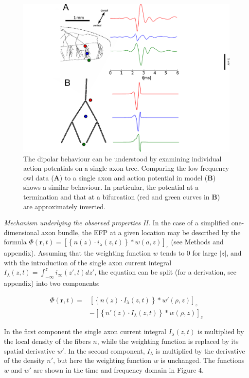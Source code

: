 \documentclass[]{article}
\begin{document}
\begin{figure}[htbp]
\centering
\includegraphics{../figs/mockups/fig4.pdf}
\caption{The dipolar behaviour can be understood by examining individual
action potentials on a single axon tree. Comparing the low frequency owl
data (\textbf{A}) to a single axon and action potential in model
(\textbf{B}) shows a similar behaviour. In particular, the potential at
a termination and that at a bifurcation (red and green curves in
\textbf{B}) are approximately inverted.}
\end{figure}

\emph{Mechanism underlying the observed properties II.} In the case of a
simplified one-dimensional axon bundle, the EFP at a given location may
be described by the formula
\(\Phi(\mathbf{r},t) = \left[\left\{n(z)\cdot i_\lambda(z,t)\right\}\ast w(a,z)\right]_z\)
(see Methods and appendix). Assuming that the weighting function \(w\)
tends to 0 for large \(\left|z\right|\), and with the introduction of
the single axon current integral
\(I_\lambda(z,t)=\int_{-\infty}^zi_\infty(z',t)dz'\), the equation can
be split (for a derivation, see appendix) into two components:

\begin{align}
  \label{eqn:splitpot} 
  \Phi(\mathbf{r},t) = &\left[\left\{n(z)\cdot I_\lambda(z,t)\right\}\ast w'(\rho,z)\right]_z \\
  & - \left[\left\{n'(z)\cdot I_\lambda(z,t)\right\}\ast w(\rho,z)\right]_z 
\end{align}

In the first component the single axon current integral
\(I_\lambda(z,t)\) is multiplied by the local density of the fibers
\(n\), while the weighting function is replaced by its spatial
derivative \(w'\). In the second component, \(I_\lambda\) is multiplied
by the derivative of the density \(n'\), but here the weighting function
\(w\) is unchanged. The functions \(w\) and \(w'\) are shown in the time
and frequency domain in Figure 4.
\end{document}
